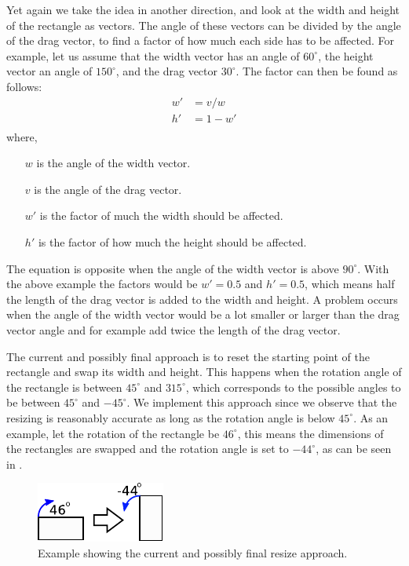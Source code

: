 Yet again we take the idea in another direction, and look at the width and height of the rectangle as vectors.
The angle of these vectors can be divided by the angle of the drag vector, to find a factor of how much each side has to be affected.
For example, let us assume that the width vector has an angle of $60^\circ$, the height vector an angle of $150^\circ$, and the drag vector $30^\circ$.
The factor can then be found as follows:
\begin{equation}
\begin{aligned}
w' &= v / w\\
h' &= 1 - w'\\
\end{aligned}
\end{equation}
where, 
\begin{itemize}
\item[$w$] is the angle of the width vector.
\item[$v$] is the angle of the drag vector.
\item[$w'$] is the factor of much the width should be affected.
\item[$h'$] is the factor of how much the height should be affected.
\end{itemize}
The equation is opposite when the angle of the width vector is above $90^\circ$.
With the above example the factors would be $w' = 0.5$ and $h' = 0.5$, which means half the length of the drag vector is added to the width and height.
A problem occurs when the angle of the width vector would be a lot smaller or larger than the drag vector angle and for example add twice the length of the drag vector.

The current and possibly final approach is to reset the starting point of the rectangle and swap its width and height.
This happens when the rotation angle of the rectangle is between $45^\circ$ and $315^\circ$, which corresponds to the possible angles to be between $45^\circ$ and $-45^\circ$.
We implement this approach since we observe that the resizing is reasonably accurate as long as the rotation angle is below $45^\circ$.
As an example, let the rotation of the rectangle be $46^\circ$, this means the dimensions of the rectangles are swapped and the rotation angle is set to $-44^\circ$, as can be seen in .
\begin{figure}
\centering
\includegraphics[scale=1]{media/sprint3/approach6}
\caption{Example showing the current and possibly final resize approach.}
\label{fig:app6}
\end{figure}
